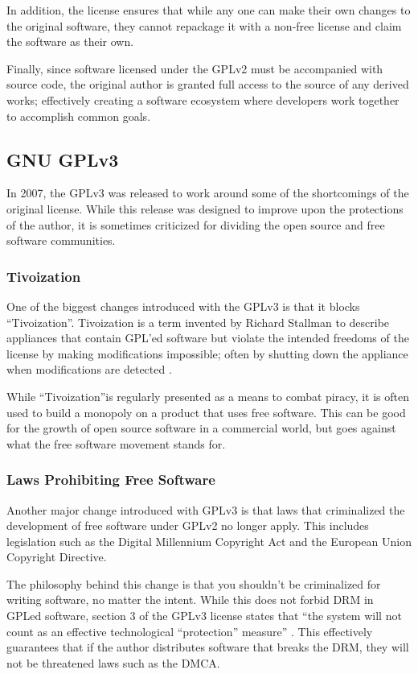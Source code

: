 \documentclass[12pt,letterpaper]{article}
\begin{document}
In addition, the license ensures that while any one can make their own changes to the original software, they cannot repackage it with a non-free license and claim the software as their own.

Finally, since software licensed under the GPLv2 must be accompanied with source code, the original author is granted full access to the source of any derived works; effectively creating a software ecosystem where developers work together to accomplish common goals.

\subsection{GNU GPLv3}

In 2007, the GPLv3 was released to work around some of the shortcomings of the original license. While this release was designed to improve upon the protections of the author, it is sometimes criticized for dividing the open source and free software communities.

\subsubsection{Tivoization}
One of the biggest changes introduced with the GPLv3 is that it blocks ``Tivoization''. Tivoization is a term invented by Richard Stallman to describe appliances that contain GPL'ed software but violate the intended freedoms of the license by making modifications impossible; often by shutting down the appliance when modifications are detected \cite{gpl3}.

While ``Tivoization''is regularly presented as a means to combat piracy, it is often used to build a monopoly on a product that uses free software. This can be good for the growth of open source software in a commercial world, but goes against what the free software movement stands for.

\subsubsection{Laws Prohibiting Free Software}

Another major change introduced with GPLv3 is that laws that criminalized the development of free software under GPLv2 no longer apply. This includes legislation such as the Digital Millennium Copyright Act and the European Union Copyright Directive.

The philosophy behind this change is that you shouldn't be criminalized for writing software, no matter the intent. While this does not forbid DRM in GPLed software, section 3 of the GPLv3 license states that ``the system will not count as an effective technological ``protection'' measure'' \cite{gpl3}. This effectively guarantees that if the author distributes software that breaks the DRM, they will not be threatened laws such as the DMCA.
\end{document}
